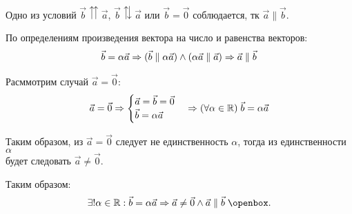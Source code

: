 \documentclass{article}
\begin{document}
Одно из условий $\vec{b}\upuparrows\vec{a}$, $\vec{b}\updownarrows\vec{a}$ или $\vec{b}=\vec{0}$ соблюдается, тк $\vec{a}\parallel\vec{b}$.

\enough

По определениям произведения вектора на число и равенства векторов:
\begin{align*}
	\vec{b}=\alpha\vec{a}\Rightarrow(\vec{b}\parallel\alpha\vec{a})\land(\alpha\vec{a}\parallel\vec{a})\Rightarrow\vec{a}\parallel\vec{b}
\end{align*}

Расммотрим случай $\vec{a}=\vec{0}$:
\begin{align*}
	\vec{a}=\vec{0}\Rightarrow
	\begin{cases}
		\vec{a}=\vec{b}=\vec{0} \\
		\vec{b}=\alpha\vec{a}
	\end{cases}\Rightarrow (\forall \alpha\in\mathbb{R})\;\vec{b}=\alpha\vec{a}
\end{align*}

Таким образом, из $\vec{a}=\vec{0}$ следует не единственность $\alpha$, тогда из единственности $\alpha$\\
будет следовать $\vec{a}\neq\vec{0}$.

Таким образом:
\begin{align*}
	\exists!\alpha\in\R:\vec{b}=\alpha\vec{a}\Rarr\vec{a}\neq\vec{0}\land\vec{a}\parallel\vec{b}\qed
\end{align*}
\end{document}
